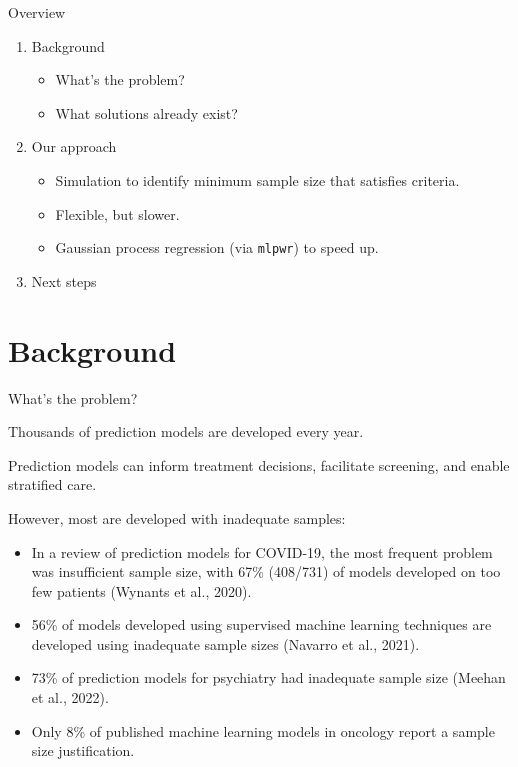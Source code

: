 \documentclass[11pt]{beamer}
\begin{document}
\begin{frame}[t]{Overview}
    \begin{enumerate}
        \item Background
            \begin{itemize}
                \item What's the problem?
                \item What solutions already exist?
            \end{itemize}
        \item Our approach
            \begin{itemize}
                \item Simulation to identify minimum sample size that satisfies criteria.
                \item Flexible, but slower.
                \item Gaussian process regression (via \texttt{mlpwr}) to speed up.
            \end{itemize}
        \item Next steps
    \end{enumerate}
\end{frame}

\section{Background}

\begin{frame}[t]{What's the problem?}

    Thousands of prediction models are developed every year.

    Prediction models can inform treatment decisions, facilitate screening, and
    enable stratified care.

    However, most are developed with inadequate samples:

    \begin{itemize}
        \item In a review of prediction models for COVID-19, the most frequent problem was insufficient sample size, with 67\% (408/731) of models developed on too few patients (Wynants et al., 2020).
        \item 56\% of models developed using supervised machine learning techniques are developed using inadequate sample sizes (Navarro et al., 2021).
        \item 73\% of prediction models for psychiatry had inadequate sample size (Meehan et al., 2022).
        \item Only 8\% of published machine learning models in oncology report a sample size justification.
    \end{itemize}
\end{frame}
\end{document}
